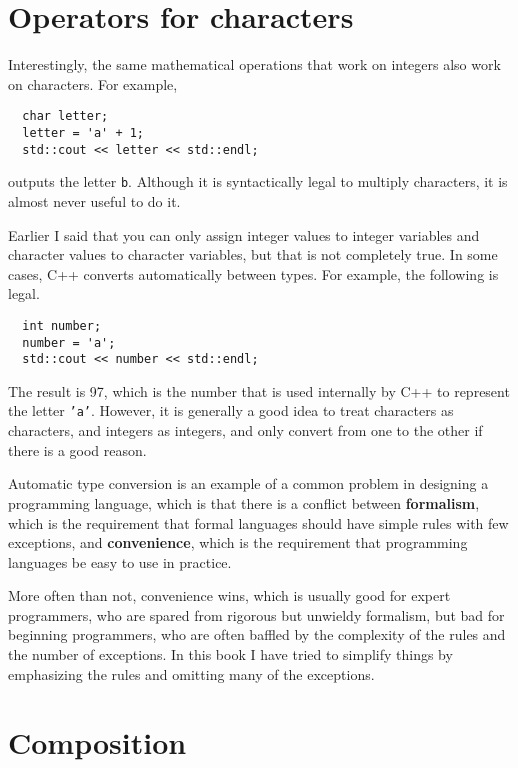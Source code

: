 \section{Operators for characters}

Interestingly, the same mathematical operations that work on
integers also work on characters.  For example,

\begin{verbatim}
  char letter;
  letter = 'a' + 1;
  std::cout << letter << std::endl;
\end{verbatim}
%
outputs the letter {\tt b}.  Although it is syntactically legal
to multiply characters, it is almost never useful to do it.

Earlier I said that you can only assign integer values to
integer variables and character values to character variables,
but that is not completely true.  In some cases, C++ converts
automatically between types.  For example, the following is
legal.

\begin{verbatim}
  int number;
  number = 'a';
  std::cout << number << std::endl;
\end{verbatim}
%
The result is 97, which is the number that is used internally
by C++ to represent the letter {\tt 'a'}.  However, it is
generally a good idea to treat characters as characters, and
integers as integers, and only convert from one to the other
if there is a good reason.

Automatic type conversion is an example of a common problem in designing a
programming language, which is that there is a conflict between {\bf
formalism}, which is the requirement that formal languages should have
simple rules with few exceptions, and {\bf convenience}, which is the
requirement that programming languages be easy to use in practice.

More often than not, convenience wins, which is usually good for
expert programmers, who are spared from rigorous but unwieldy
formalism, but bad for beginning programmers, who are often baffled
by the complexity of the rules and the number of exceptions.  In this
book I have tried to simplify things by emphasizing the rules and
omitting many of the exceptions.


\section{Composition}

